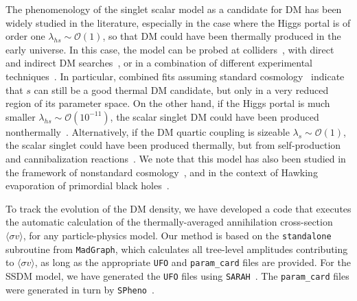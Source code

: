 \documentclass[a4paper,11pt]{article}
\newcommand{\lhs}{\lambda_{hs}}
\newcommand{\sv}{\langle\sigma v\rangle}
\begin{document}
The phenomenology of the singlet scalar model as a candidate for DM has been widely studied in the literature, especially in the case where the Higgs portal is of order one $\lhs \sim \mathcal{O}(1)$, so that DM could have been thermally produced in the early universe.
In this case, the model can be probed at colliders~\cite{Barger:2007im, Kanemura:2011nm, Djouadi:2011aa, No:2013wsa, Craig:2014lda, Robens:2015gla, Han:2016gyy, Englert:2020gcp, Garcia-Abenza:2020xkk, Biekotter:2022ckj}, with direct and indirect DM searches~\cite{Yaguna:2008hd, Goudelis:2009zz, Profumo:2010kp, Urbano:2014hda, Duerr:2015mva, DiMauro:2023tho}, or in a combination of different experimental techniques~\cite{He:2009yd, Djouadi:2012zc, Damgaard:2013kva, Baek:2014jga, Curtin:2014jma, Feng:2014vea, Han:2015hda, Duerr:2015aka, Benito:2016kyp, GAMBIT:2018eea}. In particular, combined fits assuming standard cosmology~\cite{Cline:2013gha, Beniwal:2015sdl, GAMBIT:2017gge, Athron:2018ipf} indicate that $s$ can still be a good thermal DM candidate, but only in a very reduced region of its parameter space.
On the other hand, if the Higgs portal is much smaller $\lhs \sim \mathcal{O}(10^{-11})$, the scalar singlet DM could have been produced nonthermally~\cite{Yaguna:2011qn, Campbell:2015fra, Kang:2015aqa, Belanger:2018ccd, Bernal:2018kcw, Heeba:2018wtf, Huo:2019bjf, Lebedev:2019ton, Cosme:2023xpa}.
Alternatively, if the DM quartic coupling is sizeable $\lambda_s \sim \mathcal{O}(1)$, the scalar singlet could have been produced thermally, but from self-production and cannibalization reactions~\cite{Carlson:1992fn, Bernal:2015xba, Heikinheimo:2017ofk, Arcadi:2019oxh, Bernal:2020gzm}.
We note that this model has also been studied in the framework of nonstandard cosmology~\cite{Bernal:2018ins, Hardy:2018bph, Bernal:2018kcw, Allahverdi:2020bys}, and in the context of Hawking evaporation of primordial black holes~\cite{Bernal:2020bjf}.

To track the evolution of the DM density, we have developed a code that executes the automatic calculation of the thermally-averaged annihilation cross-section $\sv$, for any particle-physics model.
Our method is based on the \texttt{standalone} subroutine from \texttt{MadGraph}, which calculates all tree-level amplitudes contributing to $\sv$, as long as the appropriate \texttt{UFO} and \texttt{param\_card} files are provided. For the SSDM model, we have generated the \texttt{UFO} files using \texttt{SARAH}~\cite{Staub:2008uz, Staub:2012pb, Staub:2013tta}. The \texttt{param\_card} files were generated in turn by \texttt{SPheno}~\cite{Porod:2003um, Porod:2011nf, Staub:2011dp}. 
\end{document}

